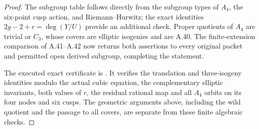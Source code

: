 \begin{proof}
The subgroup table follows directly from the subgroup types
of \(A_4\), the six-point cusp action, and Riemann--Hurwitz;
the exact identities \(2g-2+r=\deg(Y/U)\) provide an
additional check. Proper quotients of \(A_4\) are trivial or
\(C_3\), whose covers are elliptic isogenies and are A.40.
The finite-extension comparison of A.41--A.42 now returns
both assertions to every original packet and permitted
open derived subgroup, completing the statement.

The executed exact certificate is
. It verifies the translation
and three-isogeny identities modulo the actual cubic equation,
the complementary elliptic invariants, both values of \(r\),
the residual rational map and all \(A_4\) orbits on its four
nodes and six cusps. The geometric arguments above, including
the wild quotient and the passage to all covers, are separate
from these finite algebraic checks.
\end{proof}
